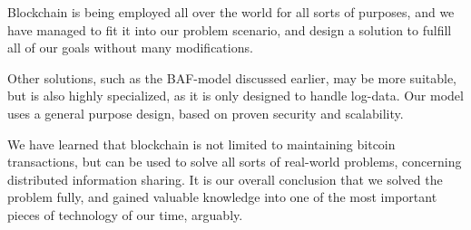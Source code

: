 
Blockchain is being employed all over the world for all sorts of
purposes, and we have managed to fit it into our problem scenario, and
design a solution to fulfill all of our goals without many
modifications.

Other solutions, such as the BAF-model discussed earlier, may be more
suitable, but is also highly specialized, as it is only designed to
handle log-data. Our model uses a general purpose design, based on
proven security and scalability.

We have learned that blockchain is not limited to maintaining bitcoin
transactions, but can be used to solve all sorts of real-world
problems, concerning distributed information sharing. It is our
overall conclusion that we solved the problem fully, and gained
valuable knowledge into one of the most important pieces of technology
of our time, arguably.

